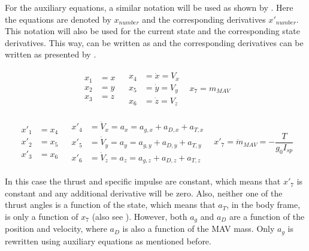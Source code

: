 For the auxiliary equations, a similar notation will be used as shown by \cite{scott2008high}. Here the equations are denoted by $x_{number}$ and the corresponding derivatives $x'_{number}$. This notation will also be used for the current state and the corresponding state derivatives. This way,  can be written as  and the corresponding derivatives can be written as presented by .

\begin{align} \label{eq:stateX}
\begin{split} 
x_{1}&=x\\
x_{2}&=y\\
x_{3}&=z
\end{split} 
&
\begin{split}
x_{4}&=\dot{x}=V_{x}\\
x_{5}&=\dot{y}=V_{y}\\
x_{6}&=\dot{z}=V_{z}
\end{split}
&
x_{7}=m_{MAV}
\end{align}


\begin{align} \label{eq:state_derivativesX}
\begin{split} 
x'_{1}&=x_{4}\\
x'_{2}&=x_{5}\\
x'_{3}&=x_{6}
\end{split} 
&
\begin{split}
x'_{4}&=\dot{V}_{x}=a_{x}=a_{g,x}+a_{D,x}+a_{T,x}\\
x'_{5}&=\dot{V}_{y}=a_{y}=a_{g,y}+a_{D,y}+a_{T,y}\\
x'_{6}&=\dot{V}_{z}=a_{z}=a_{g,z}+a_{D,z}+a_{T,z}
\end{split}
&
x'_{7}=\dot{m}_{MAV}=-\dfrac{T}{g_{0}I_{sp}}
\end{align}

In this case the thrust and specific impulse are constant, which means that $x'_{7}$ is constant and any additional derivative will be zero. Also, neither one of the thrust angles is a function of the state, which means that $a_{T}$, in the body frame, is only a function of $x_{7}$ (also see ). However, both $a_{g}$ and $a_{D}$ are a function of the position and velocity, where $a_{D}$ is also a function of the \ac{MAV} mass. Only $a_{g}$ is rewritten using auxiliary equations as mentioned before. 





